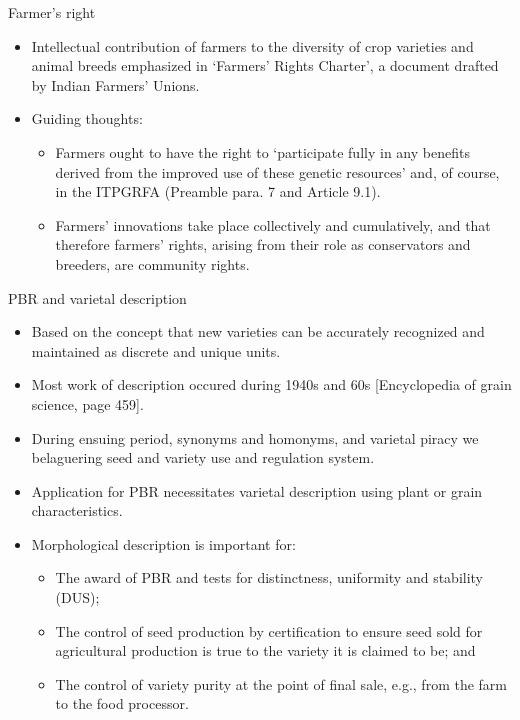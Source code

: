 \documentclass[
  ignorenonframetext,
  aspectratio=169]{beamer}
\providecommand{\tightlist}{%
  \setlength{\itemsep}{0pt}\setlength{\parskip}{0pt}}
\begin{document}
\begin{frame}{Farmer's right}
\protect\hypertarget{farmers-right}{}
\begin{itemize}
\tightlist
\item
  Intellectual contribution of farmers to the diversity of crop
  varieties and animal breeds emphasized in `Farmers' Rights Charter', a
  document drafted by Indian Farmers' Unions.
\item
  Guiding thoughts:

  \begin{itemize}
  \tightlist
  \item
    Farmers ought to have the right to `participate fully in any
    benefits derived from the improved use of these genetic resources'
    and, of course, in the ITPGRFA (Preamble para. 7 and Article 9.1).
  \item
    Farmers' innovations take place collectively and cumulatively, and
    that therefore farmers' rights, arising from their role as
    conservators and breeders, are community rights.
  \end{itemize}
\end{itemize}
\end{frame}

\begin{frame}{PBR and varietal description}
\protect\hypertarget{pbr-and-varietal-description}{}
\begin{itemize}
\tightlist
\item
  Based on the concept that new varieties can be accurately recognized
  and maintained as discrete and unique units.
\item
  Most work of description occured during 1940s and 60s {[}Encyclopedia
  of grain science, page 459{]}.
\item
  During ensuing period, synonyms and homonyms, and varietal piracy we
  belaguering seed and variety use and regulation system.
\item
  Application for PBR necessitates varietal description using plant or
  grain characteristics.
\end{itemize}
\end{frame}

\begin{frame}{}
\protect\hypertarget{section}{}
\begin{itemize}
\tightlist
\item
  Morphological description is important for:

  \begin{itemize}
  \tightlist
  \item
    The award of PBR and tests for distinctness, uniformity and
    stability (DUS);
  \item
    The control of seed production by certification to ensure seed sold
    for agricultural production is true to the variety it is claimed to
    be; and
  \item
    The control of variety purity at the point of final sale, e.g., from
    the farm to the food processor.
  \end{itemize}
\end{itemize}
\end{frame}
\end{document}
